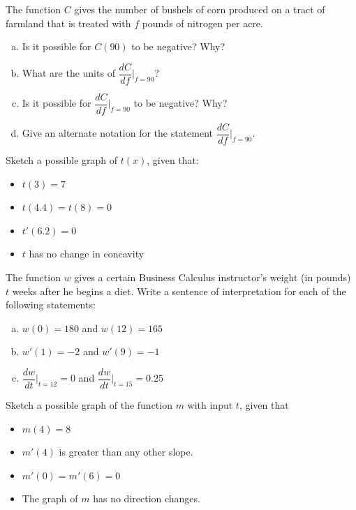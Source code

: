 \documentclass[notes]{subfiles}
\begin{document}
		\begin{ex} The function $C$ gives the number of bushels of corn produced on a tract of farmland that is treated with $f$ pounds of nitrogen per acre.
			\begin{enumerate}[(a)]
				\item Is it possible for $C(90)$ to be negative?  Why?
				\item What are the units of $\dfrac{dC}{df}\bigg|_{f=90}$?
				\item Is it possible for $\dfrac{dC}{df}\bigg|_{f=90}$ to be negative?  Why?
				\item Give an alternate notation for the statement $\dfrac{dC}{df}\bigg|_{f=90}$.
			\end{enumerate}
		\end{ex}
			\newpage
			
		\begin{ex} Sketch a possible graph of $t(x)$, given that:
			\begin{itemize}
				\item $t(3) = 7$
				\item $t(4.4) = t(8) = 0$
				\item $t'(6.2) = 0$
				\item $t$ has no change in concavity
			\end{itemize}
		\end{ex}
			
		\begin{ex}
			The function $w$ gives a certain Business Calculus instructor's weight (in pounds) $t$ weeks after he begins a diet.  Write a sentence of interpretation for each of the following statements:
			\begin{enumerate}[(a)]
				\item $w(0) = 180$ and $w(12) = 165$
					
				\item $w'(1) = -2$ and $w'(9) = -1$
					
				\item $\dfrac{dw}{dt}\bigg|_{t=12} = 0$ and $\dfrac{dw}{dt}\bigg|_{t=15} = 0.25$
					
			\end{enumerate}
		\end{ex}
			\newpage
			
		\begin{ex}
			Sketch a possible graph of the function $m$ with input $t$, given that
			\begin{itemize}
				\item $m(4) = 8$
				\item $m'(4)$ is greater than any other slope.
				\item $m'(0) = m'(6) = 0$
				\item The graph of $m$ has no direction changes.
			\end{itemize}
		\end{ex}
			
\end{document}
